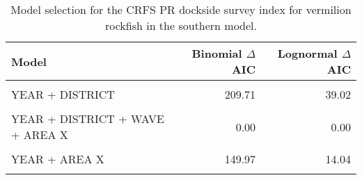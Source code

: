 \documentclass[
]{article}
\begin{document}
\begin{table}

\caption{\label{tab:tab-model-select-crfspr}Model selection for the CRFS PR dockside survey index for vermilion rockfish in the southern model.}
\centering
\begin{tabular}[t]{lrr}
\toprule
Model & Binomial $\Delta$AIC & Lognormal $\Delta$AIC\\
\midrule
\cellcolor{gray!6}{1} & \cellcolor{gray!6}{328.75} & \cellcolor{gray!6}{168.29}\\
YEAR + DISTRICT & 209.71 & 39.02\\
\cellcolor{gray!6}{YEAR + DISTRICT + WAVE} & \cellcolor{gray!6}{65.11} & \cellcolor{gray!6}{29.58}\\
YEAR + DISTRICT + WAVE + AREA X & 0.00 & 0.00\\
\cellcolor{gray!6}{YEAR + WAVE + AREA X} & \cellcolor{gray!6}{2.48} & \cellcolor{gray!6}{5.11}\\
\addlinespace
YEAR + AREA X & 149.97 & 14.04\\
\cellcolor{gray!6}{YEAR + DISTRICT + AREA X} & \cellcolor{gray!6}{145.89} & \cellcolor{gray!6}{9.79}\\
\bottomrule
\end{tabular}
\end{table}

\FloatBarrier
\end{document}
